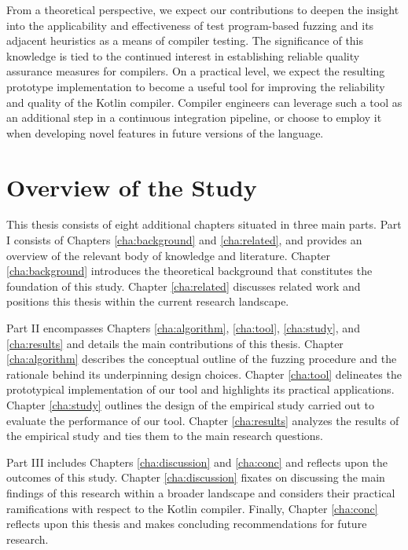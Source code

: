 From a theoretical perspective, we expect our contributions
to deepen the insight into the applicability and effectiveness
of test program-based fuzzing and its adjacent heuristics as a 
means of compiler testing. 
The significance of this knowledge is tied to the continued
interest in establishing reliable quality assurance measures for compilers.
On a practical level, we expect the resulting
prototype implementation to become a useful tool for improving the 
reliability and quality of the Kotlin compiler.
Compiler engineers can leverage such a tool as an additional
step in a continuous integration pipeline, or choose to employ it
when developing novel features in future versions of the language.

\section{Overview of the Study}

This thesis consists of eight additional chapters situated in three main parts.
Part I consists of Chapters \ref{cha:background} and \ref{cha:related}, and
provides an overview of the relevant body of knowledge and literature.
Chapter \ref{cha:background} introduces the theoretical background
that constitutes the foundation of this study.
Chapter \ref{cha:related} discusses related work and positions this
thesis within the current research landscape.

Part II encompasses Chapters \ref{cha:algorithm}, \ref{cha:tool}, \ref{cha:study}, and \ref{cha:results}
and details the main contributions of this thesis. 
Chapter \ref{cha:algorithm} describes the conceptual outline of
the fuzzing procedure and the rationale behind its
underpinning design choices.
Chapter \ref{cha:tool} delineates the prototypical implementation
of our tool and highlights its practical applications.
Chapter \ref{cha:study} outlines the design of the empirical
study carried out to evaluate the performance of our tool.
Chapter \ref{cha:results} analyzes the results of the empirical study
and ties them to the main research questions.

Part III includes Chapters \ref{cha:discussion} and \ref{cha:conc} 
and reflects upon the outcomes of this study.
Chapter \ref{cha:discussion} fixates on discussing the main 
findings of this research within a broader landscape
and considers their practical ramifications with respect to the Kotlin compiler.
Finally, Chapter \ref{cha:conc} reflects upon this
thesis and makes concluding recommendations for future research.


